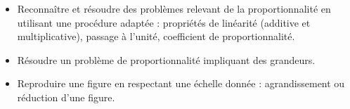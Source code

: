 \begin{prerequis}    
    \begin{itemize}
        \item[\emoji{diamond-suit}] Reconnaître et résoudre des problèmes relevant de la proportionnalité en utilisant une procédure adaptée : propriétés de linéarité (additive et multiplicative), passage à l’unité, coefficient de proportionnalité.
        \item[\emoji{diamond-suit}] Résoudre un problème de proportionnalité impliquant des grandeurs.
        \item[\emoji{diamond-suit}] Reproduire une figure en respectant une échelle donnée : agrandissement ou réduction d’une figure.
    \end{itemize}
\end{prerequis}